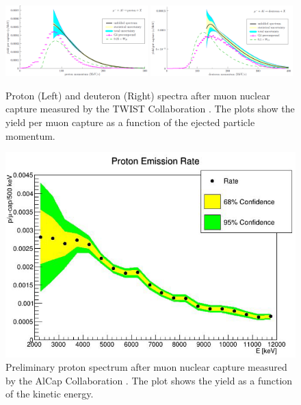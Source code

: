 \documentclass[12pt,a4paper,openright, oneside, titlepage]{book} %
\begin{document}
\begin{figure}[!htb]
\centering
\includegraphics[width=0.49\textwidth]{new_spectra_2/Gaponenko_protons}\hfill
\includegraphics[width=0.49\textwidth]{new_spectra_2/Gaponenko_deuterons}
\caption[TWIST measured spectra]{Proton (Left) and deuteron (Right) spectra after muon nuclear capture measured
by the TWIST Collaboration \cite{TWIST:2020}. The plots show
the yield per muon capture as a function of the ejected particle momentum.}
\label{_TWIST}
\end{figure}

\begin{figure}[h!]
\centering
\includegraphics[scale=0.6]{new_spectra_2/Quirk_protons}
\caption[AlCap measured spectra]{Preliminary proton spectrum after muon nuclear capture measured by the AlCap Collaboration \cite{AlCap:2020}. 
The plot shows the yield as a function of the kinetic energy.}
\label{_AlCap}
\end{figure}
\end{document}
